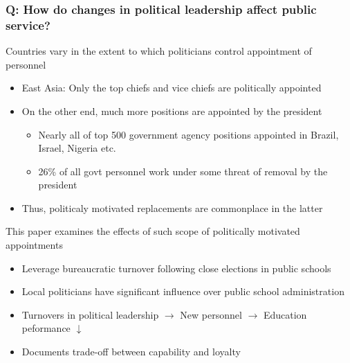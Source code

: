 \documentclass[aspectratio=169]{beamer}
\begin{document}
\begin{frame}
\frametitle{Q: How do changes in political leadership affect public service?} 
Countries vary in the extent to which politicians control appointment of personnel
\begin{itemize}\setlength\itemsep{3pt}
\item East Asia: Only the top chiefs and vice chiefs are politically appointed
\item On the other end, much more positions are appointed by the president
  \begin{itemize}\setlength\itemsep{3pt}
  \item Nearly all of top 500 government agency positions appointed in Brazil, Israel, Nigeria etc.
  \item 26\% of all govt personnel work under some threat of removal by the president
\end{itemize}
\item Thus, politicaly motivated replacements are commonplace in the latter 
\end{itemize}\medskip
This paper examines the effects of such scope of politically motivated appointments
\begin{itemize}\setlength\itemsep{3pt}
  \item Leverage bureaucratic turnover following close elections in public schools
  \item Local politicians have significant influence over public school administration
\item Turnovers in political leadership $\to$ New personnel $\to$ Education peformance $\downarrow$
\item Documents trade-off between capability and loyalty 
\end{itemize}
\end{frame}
\end{document}
